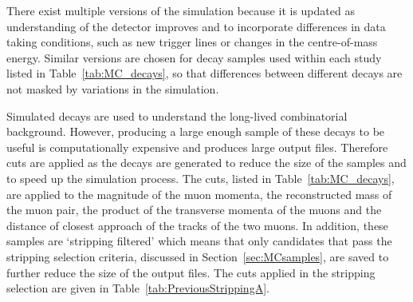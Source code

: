 There exist multiple versions of the simulation because it is updated as understanding of the detector improves and to incorporate differences in data taking conditions, such as new trigger lines or changes in the centre-of-mass energy. 
Similar versions are chosen for decay samples used within each study listed in Table~\ref{tab:MC_decays}, so that differences between different decays are not masked by variations in the simulation.%




Simulated \bbbarmumux decays are used to understand the long-lived combinatorial background. However, producing a large enough sample of these decays to be useful is computationally expensive and produces large output files. Therefore cuts are applied as the decays are generated to reduce the size of the samples and to speed up the simulation process. The cuts, listed in Table~\ref{tab:MC_decays}, are applied to the magnitude of the muon momenta, the reconstructed mass of the muon pair, the product of the transverse momenta of the muons and the distance of closest approach of the tracks of the two muons. In addition, these samples are `stripping filtered' which means that only candidates that pass the \bmumu stripping selection criteria, discussed in Section~\ref{sec:MCsamples}, are saved to further reduce the size of the output files. The cuts applied in the stripping selection are given in Table~\ref{tab:PreviousStrippingA}.%
  

